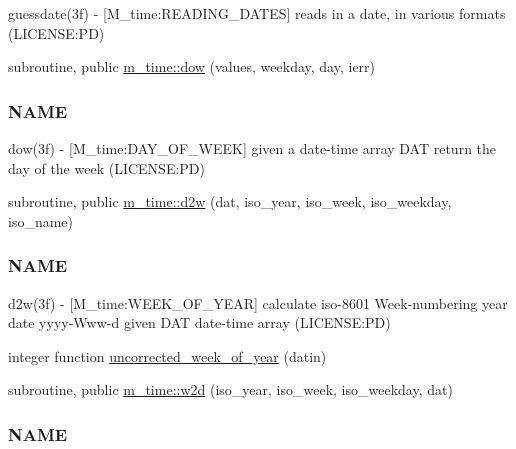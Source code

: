 \begin{DoxyCompactItemize}
\begin{DoxyCompactList}
guessdate(3f) -\/ \mbox{[}M\+\_\+time\+:R\+E\+A\+D\+I\+N\+G\+\_\+\+D\+A\+T\+ES\mbox{]} reads in a date, in various formats (L\+I\+C\+E\+N\+SE\+:PD) \end{DoxyCompactList}\item 
subroutine, public \mbox{\hyperlink{namespacem__time_adfda8a89820b8d0ad4581a14896e4ce5}{m\+\_\+time\+::dow}} (values, weekday, day, ierr)
\begin{DoxyCompactList}\small\item\em \subsubsection*{N\+A\+ME}

dow(3f) -\/ \mbox{[}M\+\_\+time\+:D\+A\+Y\+\_\+\+O\+F\+\_\+\+W\+E\+EK\mbox{]} given a date-\/time array D\+AT return the day of the week (L\+I\+C\+E\+N\+SE\+:PD) \end{DoxyCompactList}\item 
subroutine, public \mbox{\hyperlink{namespacem__time_ad4ff99ad6f6d5282c4b65ad636a2a627}{m\+\_\+time\+::d2w}} (dat, iso\+\_\+year, iso\+\_\+week, iso\+\_\+weekday, iso\+\_\+name)
\begin{DoxyCompactList}\small\item\em \subsubsection*{N\+A\+ME}

d2w(3f) -\/ \mbox{[}M\+\_\+time\+:W\+E\+E\+K\+\_\+\+O\+F\+\_\+\+Y\+E\+AR\mbox{]} calculate iso-\/8601 Week-\/numbering year date yyyy-\/\+Www-\/d given D\+AT date-\/time array (L\+I\+C\+E\+N\+SE\+:PD) \end{DoxyCompactList}\item 
integer function \mbox{\hyperlink{M__time_8f90_a4a68c5e906616f64da0c3d165fc41479}{uncorrected\+\_\+week\+\_\+of\+\_\+year}} (datin)
\item 
subroutine, public \mbox{\hyperlink{namespacem__time_ac0ec48db8d508bfa23fe4b20c9d1c5a3}{m\+\_\+time\+::w2d}} (iso\+\_\+year, iso\+\_\+week, iso\+\_\+weekday, dat)
\begin{DoxyCompactList}\small\item\em \subsubsection*{N\+A\+ME}


\end{DoxyCompactList}
\end{DoxyCompactItemize}
